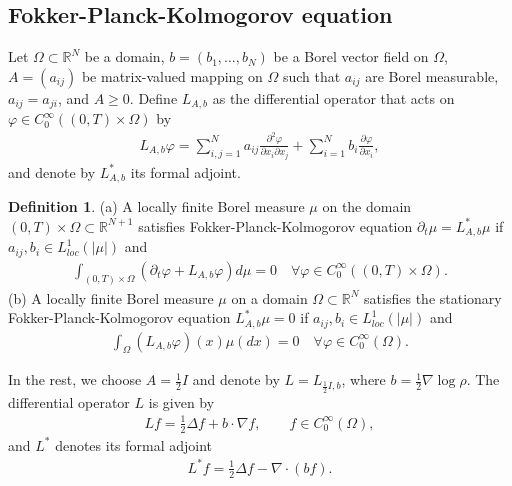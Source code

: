 \documentclass[11pt]{article}
\numberwithin{equation}{section}
\theoremstyle{definition}
\newtheorem{definition}[theorem]{Definition}
\begin{document}
\subsection{Fokker-Planck-Kolmogorov equation}\label{sec::FPK_and_ergodicity}
Let $\Omega\subset\mathbb{R}^{N}$ be a domain, $b=(b_{1},\dots,b_{N})$ be a Borel vector field on $\Omega$, $A = (a_{ij})$ be matrix-valued mapping on $\Omega$ such that $a_{ij}$ are Borel measurable, $a_{ij}=a_{ji}$, and $A\ge0$. Define $L_{A,b}$ as the differential operator that acts on $\varphi\in C_{0}^{\infty}((0,T)\times\Omega)$ by
\begin{align*}
    L_{A,b}\varphi = \sum\limits_{i,j=1}^{N}a_{ij}\frac{\partial^2\varphi}{\partial x_{i}\partial x_{j}} + \sum\limits_{i=1}^{N}b_{i}\frac{\partial\varphi}{\partial x_{i}},
\end{align*}
and denote by $L^*_{A,b}$ its formal adjoint.
\begin{definition}
(a) A locally finite Borel measure $\mu$ on the domain $(0,T)\times\Omega\subset \mathbb{R}^{N+1}$ satisfies Fokker-Planck-Kolmogorov equation $\partial_{t}\mu = L^{*}_{A,b}\mu$
if $a_{ij}, b_{i}\in L^{1}_{loc}(|\mu|)$ and
\begin{align*}
    \int_{(0,T)\times\Omega}(\partial_{t}\varphi+L_{A,b}\varphi)d\mu
    =0 
    \quad \forall\varphi\in C_{0}^{\infty}((0,T)\times\Omega).
\end{align*}
(b) A locally finite Borel measure $\mu$ on a domain $\Omega\subset \mathbb{R}^{N}$ satisfies the stationary Fokker-Planck-Kolmogorov equation  $L^{*}_{A,b}\mu = 0$
if $a_{ij}, b_{i}\in L^{1}_{loc}(|\mu|)$ and
\begin{align*}
    \int_{\Omega}(L_{A,b}\varphi)(x) \mu(dx)=0 \quad \forall\varphi\in C_{0}^{\infty}(\Omega).
\end{align*}
\end{definition} 

In the rest, we choose $A = \frac{1}{2}I$ and denote by $L = L_{\frac{1}{2}I,b}$, where $b = \frac{1}{2}\nabla \log\rho$.  The differential operator $L$ is given by 
\begin{align*}
    Lf = \frac{1}{2}\Delta f + b\cdot \nabla f, \qquad f\in C_{0}^{\infty}(\Omega),
\end{align*}
and $L^{*}$ denotes its formal adjoint
\begin{align*}
    L^{*}f = \frac{1}{2}\Delta f- \nabla\cdot (b f).
\end{align*}
\end{document}
